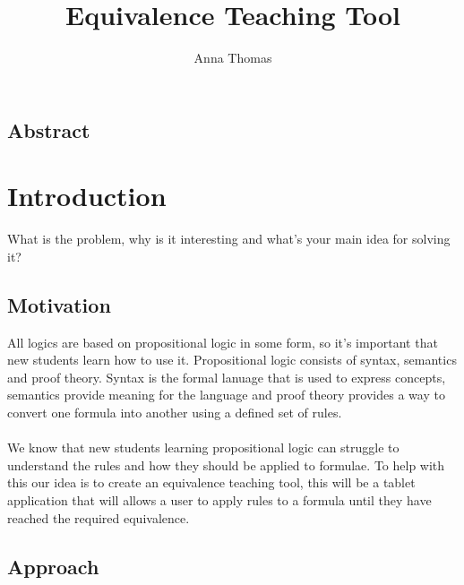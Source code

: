 \documentclass{report}
\begin{document}
 

\title{Equivalence Teaching Tool} 
\author{Anna Thomas} 

\maketitle 

\begin{center}
\section*{Abstract} 
\end{center}

\tableofcontents 
\chapter{Introduction} 

What is the problem, why is it interesting and what’s your main idea for solving it?

\section{Motivation} 
All logics are based on propositional logic in some form, so it's important that new students learn how to use it. Propositional logic consists of syntax, semantics and proof theory. Syntax is the formal lanuage that is used to express concepts, semantics provide meaning for the language and proof theory provides a way to convert one formula into another using a defined set of rules.
\\\\
We know that new students learning propositional logic can struggle to understand the rules and how they should be applied to formulae. To help with this our idea is to create an equivalence teaching tool, this will be a tablet application that will allows a user to apply rules to a formula until they have reached the required equivalence.

\section{Approach}
\end{document}
